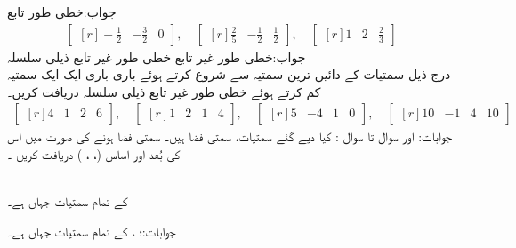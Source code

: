جواب:خطی طور تابع
\begin{align*}
\begin{bmatrix*}[r] 
-\frac{1}{2}&-\frac{3}{2}&0
\end{bmatrix*},\quad \begin{bmatrix*}[r] 
\frac{2}{5}&-\frac{1}{2}&\frac{1}{2}
\end{bmatrix*},\quad \begin{bmatrix*}[r] 
1&2&\frac{2}{3}
\end{bmatrix*}
\end{align*}
جواب:خطی طور غیر تابع
\quad خطی طور غیر تابع ذیلی سلسلہ\\
درج ذیل سمتیات کے دائیں ترین سمتیہ  سے شروع کرتے ہوئے باری باری ایک ایک سمتیہ کم کرتے ہوئے خطی طور غیر تابع ذیلی سلسلہ دریافت کریں۔
\begin{align*}
\begin{bmatrix*}[r] 
4&1&2&6
\end{bmatrix*},\quad \begin{bmatrix*}[r] 
1&2&1&4
\end{bmatrix*},\quad \begin{bmatrix*}[r] 
5&-4&1&0
\end{bmatrix*},\quad \begin{bmatrix*}[r] 
10&-1&4&10
\end{bmatrix*}
\end{align*}
جوابات: اور 
سوال  تا سوال : کیا دیے گئے سمتیات، سمتی فضا ہیں۔ سمتی فضا ہونے کی صورت میں اس کی بُعد اور اساس  (، ،  ) دریافت کریں ۔

\\
 کے تمام سمتیات جہاں  ہے۔

جوابات:؛ ، 
 کے تمام سمتیات جہاں  ہے۔

